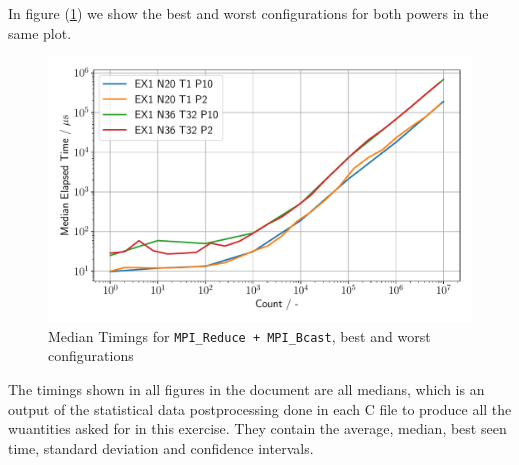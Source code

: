In figure (\ref{Ex1_3_p}) we show the best and worst configurations for both powers in the same plot. 
\begin{figure}[h]
    \begin{center}
        \includegraphics[width=0.8\linewidth]{figures/Ex1_3.pdf}
        \caption{Median Timings for \texttt{MPI\_Reduce + MPI\_Bcast}, best and worst configurations}
        \label{Ex1_3_p}
    \end{center}
\end{figure}

The timings shown in all figures in the document are all medians, which is an output of the statistical data postprocessing 
done in each C file to produce all the wuantities asked for in this exercise. They contain the average, median,
best seen time, standard deviation and confidence intervals.